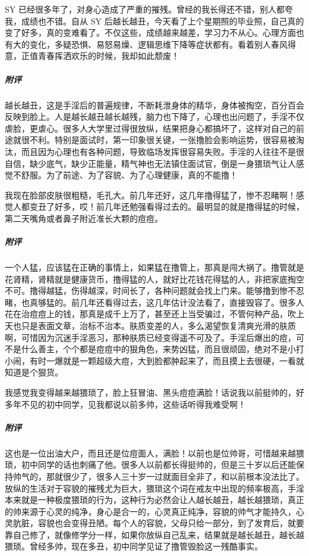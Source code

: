 \begin{case}[变丑]
    SY 已经很多年了，对身心造成了严重的摧残。曾经的我长得还不错，别人都夸我，成绩也不错。自从 SY 后越长越丑，今天看了上个星期照的毕业照，自己真的变了好多，真的变难看了。不仅这些，成绩越来越差，学习力不从心。心理方面也有大的变化，多疑恐惧、易怒易燥、逻辑思维下降等症状都有。看着别人春风得意，正值青春挥洒欢乐的时候，我却如此颓废！
    \subparagraph{附评} 越长越丑，这是手淫后的普遍规律，不断耗泄身体的精华，身体被掏空，百分百会反映到脸上。人是越长越丑越长越残，脑力也下降了，心理也出问题了，手淫不仅虐脸，更虐心。很多人大学里过得很放纵，结果把身心都搞坏了，这样对自己的前途就很不利。特别是面试时，第一印象很关键，一张撸脸会影响运势，很容易被淘汰，而且因为心理也有各种问题，导致临场发挥很容易失败。手淫的人往往不是很自信，缺少底气，缺少正能量，精气神也无法镇住面试官，倒是一身猥琐气让人感觉不舒服。为了前途、为了容貌、为了心理健康，真的不能撸！
\end{case}

\begin{case}[变丑]
    我现在脸部皮肤很粗糙，毛孔大。前几年还好，这几年撸得猛了，惨不忍睹啊！感觉人都变丑了好多，哎！前几年还勉强看得过去的。最明显的就是撸得猛的时候，第二天嘴角或者鼻子附近准长大颗的痘痘。
    \subparagraph{附评} 一个人猛，应该猛在正确的事情上，如果猛在撸管上，那真是闯大祸了。撸管就是花肾精，肾精就是健康货币，撸得猛的人，就好比花钱花得猛的人，非把家底掏空不可。撸得越猛，伤得越深，时间长了，各种问题就会找上门来。能够撸到惨不忍睹，也真够猛的。前几年还看得过去，这几年估计没法看了，直接毁容了。很多人花在治痘痘上的钱，那真是成千上万了，甚至还上当受骗过，不管何种产品，吹上天也只是表面文章，治标不治本。肤质变差的人，多么渴望恢复清爽光滑的肤质啊，可惜因为沉迷手淫恶习，那种肤质已经变得遥不可及了。手淫后爆出的痘，可不是什么善主，个个都是痘痘中的狠角色，来势凶猛，而且很顽固，绝对不是小打小闹，有时一爆就是一颗超级大痘，大到脸都肿起来了，而且摸上去很硬，一看就知道是个狠货。
\end{case}

\begin{case}[变丑]
    我感觉我变得越来越猥琐了，脸上狂冒油、黑头痘痘满脸！话说我以前挺帅的，好多年不见的初中同学，见我都说以前多帅，这些话听得我难受啊！
    \subparagraph{附评} 这也是一位出油大户，而且还是位痘面人，满脸！以前也是位帅哥，可惜越来越猥琐，初中同学的话也刺痛了他。很多人以前都长得挺帅的，但是三十岁以后还能保持帅气的，那就很少了，很多人三十岁一过就面目全非了，和以前根本没法比了。放纵的生活对于容貌的摧残尤为巨大，猥琐这个词在戒友中出现的频率极高，手淫本来就是一种极度猥琐的行为，这种行为必然会让人越长越丑，越长越猥琐，真正的帅来源于心灵的纯净，身心是合一的，心灵真正纯净，容貌的帅气才能持久，心灵肮脏，容貌也会变得丑陋。每个人的容貌，父母只给一部分，到了发育后，就要靠自己修了，就像修学分一样，如果你放纵自己乱来，结果就是越长越丑，越长越猥琐。曾经多帅，现在多丑，初中同学见证了撸管毁脸这一残酷事实。
\end{case}

